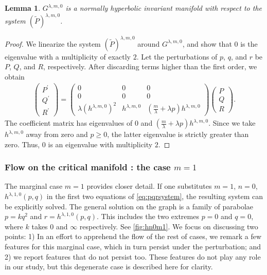 \documentclass[a4paper,11pt]{article}
\newtheorem{lemma}{Lemma}[section]
\numberwithin{step}{dummy}
\begin{document}
\begin{lemma} \label{lem:normal_hyper}
 $G^{\lambda,m,0}$ is a normally hyperbolic invariant manifold with respect to the system $(\tilde{P})^{ \lambda,m,0}$.
\end{lemma}
\begin{proof}
We linearize the system $(\tilde{P})^{ \lambda,m,0}$ around $G^{\lambda,m,0}$, and show that $0$ is the eigenvalue with a multiplicity of exactly $2$. Let the perturbations of $p$, $q$, and $r$ be $P$, $Q$, and $R$, respectively. After discarding  terms higher than the first order, we obtain
\begin{align*}
 \begin{pmatrix} {P}^\prime\\ {Q}^\prime \\ {R}^\prime \end{pmatrix} =
 \begin{pmatrix} 0 & 0& 0\\ 0 & 0 & 0\\ \lambda (h^{\lambda,m,0})^2 & h^{\lambda,m,0} & ( \frac{m}{ \lambda} + \lambda p )h^{\lambda,m,0} \end{pmatrix} \begin{pmatrix} {P}\\ {Q} \\ {R} \end{pmatrix}.
\end{align*}
The coefficient matrix has eigenvalues of $0$ and $( \frac{m}{ \lambda} + \lambda p )h^{\lambda,m,0}$. Since we take $h^{\lambda,m,0}$ away from zero and $p \ge 0$, the latter eigenvalue is strictly greater than zero. Thus, $0$ is an eigenvalue with multiplicity $2$. %
\end{proof}

\subsubsection{Flow on the critical manifold : the case $m=1$}

The marginal case $m=1$ provides closer detail. If one substitutes $m = 1$, $n = 0$, $h^{\lambda,1,0}(p,q)$ in the first two equations of \eqref{eq:pqrsystem}, the resulting system can be explicitly solved. The general solution on the graph is a family of parabolae $p=kq^2$ and $r=h^{\lambda,1,0}(p,q)$. This includes the two extremes $p=0$ and $q=0$, where $k$ takes $0$ and $\infty$ respectively. See \eqref{fig:hn0m1}. We focus on discussing two points: 1) In an effort to apprehend the flow of the rest of cases, we remark a few features for this marginal case, which in turn persist under the perturbation; and 2) we report features that do not persist too. These features do not play any role in our study, but this degenerate case is described here for clarity.
\end{document}
